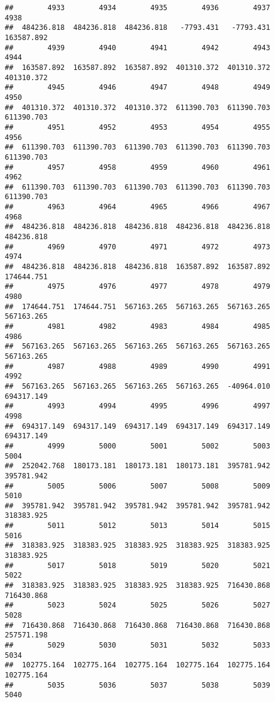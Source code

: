\documentclass[
]{book}
\begin{document}
\begin{verbatim}
##        4933        4934        4935        4936        4937        4938 
##  484236.818  484236.818  484236.818   -7793.431   -7793.431  163587.892 
##        4939        4940        4941        4942        4943        4944 
##  163587.892  163587.892  163587.892  401310.372  401310.372  401310.372 
##        4945        4946        4947        4948        4949        4950 
##  401310.372  401310.372  401310.372  611390.703  611390.703  611390.703 
##        4951        4952        4953        4954        4955        4956 
##  611390.703  611390.703  611390.703  611390.703  611390.703  611390.703 
##        4957        4958        4959        4960        4961        4962 
##  611390.703  611390.703  611390.703  611390.703  611390.703  611390.703 
##        4963        4964        4965        4966        4967        4968 
##  484236.818  484236.818  484236.818  484236.818  484236.818  484236.818 
##        4969        4970        4971        4972        4973        4974 
##  484236.818  484236.818  484236.818  163587.892  163587.892  174644.751 
##        4975        4976        4977        4978        4979        4980 
##  174644.751  174644.751  567163.265  567163.265  567163.265  567163.265 
##        4981        4982        4983        4984        4985        4986 
##  567163.265  567163.265  567163.265  567163.265  567163.265  567163.265 
##        4987        4988        4989        4990        4991        4992 
##  567163.265  567163.265  567163.265  567163.265  -40964.010  694317.149 
##        4993        4994        4995        4996        4997        4998 
##  694317.149  694317.149  694317.149  694317.149  694317.149  694317.149 
##        4999        5000        5001        5002        5003        5004 
##  252042.768  180173.181  180173.181  180173.181  395781.942  395781.942 
##        5005        5006        5007        5008        5009        5010 
##  395781.942  395781.942  395781.942  395781.942  395781.942  318383.925 
##        5011        5012        5013        5014        5015        5016 
##  318383.925  318383.925  318383.925  318383.925  318383.925  318383.925 
##        5017        5018        5019        5020        5021        5022 
##  318383.925  318383.925  318383.925  318383.925  716430.868  716430.868 
##        5023        5024        5025        5026        5027        5028 
##  716430.868  716430.868  716430.868  716430.868  716430.868  257571.198 
##        5029        5030        5031        5032        5033        5034 
##  102775.164  102775.164  102775.164  102775.164  102775.164  102775.164 
##        5035        5036        5037        5038        5039        5040 

\end{verbatim}
\end{document}
